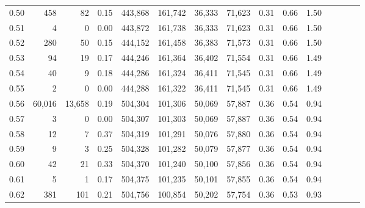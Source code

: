 \begin{tabular}{rrrcrrrrrrrrrrr}
0.50 &     458 &      82 &                                       0.15 &  443,868 &  161,742 &   36,333 &   71,623 &  0.31 &  0.66 &                         1.50 \\
0.51 &       4 &       0 &                                       0.00 &  443,872 &  161,738 &   36,333 &   71,623 &  0.31 &  0.66 &                         1.50 \\
0.52 &     280 &      50 &                                       0.15 &  444,152 &  161,458 &   36,383 &   71,573 &  0.31 &  0.66 &                         1.50 \\
0.53 &      94 &      19 &                                       0.17 &  444,246 &  161,364 &   36,402 &   71,554 &  0.31 &  0.66 &                         1.49 \\
0.54 &      40 &       9 &                                       0.18 &  444,286 &  161,324 &   36,411 &   71,545 &  0.31 &  0.66 &                         1.49 \\
0.55 &       2 &       0 &                                       0.00 &  444,288 &  161,322 &   36,411 &   71,545 &  0.31 &  0.66 &                         1.49 \\
0.56 &  60,016 &  13,658 &                                       0.19 &  504,304 &  101,306 &   50,069 &   57,887 &  0.36 &  0.54 &                         0.94 \\
0.57 &       3 &       0 &                                       0.00 &  504,307 &  101,303 &   50,069 &   57,887 &  0.36 &  0.54 &                         0.94 \\
0.58 &      12 &       7 &                                       0.37 &  504,319 &  101,291 &   50,076 &   57,880 &  0.36 &  0.54 &                         0.94 \\
0.59 &       9 &       3 &                                       0.25 &  504,328 &  101,282 &   50,079 &   57,877 &  0.36 &  0.54 &                         0.94 \\
0.60 &      42 &      21 &                                       0.33 &  504,370 &  101,240 &   50,100 &   57,856 &  0.36 &  0.54 &                         0.94 \\
0.61 &       5 &       1 &                                       0.17 &  504,375 &  101,235 &   50,101 &   57,855 &  0.36 &  0.54 &                         0.94 \\
0.62 &     381 &     101 &                                       0.21 &  504,756 &  100,854 &   50,202 &   57,754 &  0.36 &  0.53 &                         0.93 \\

\end{tabular}
